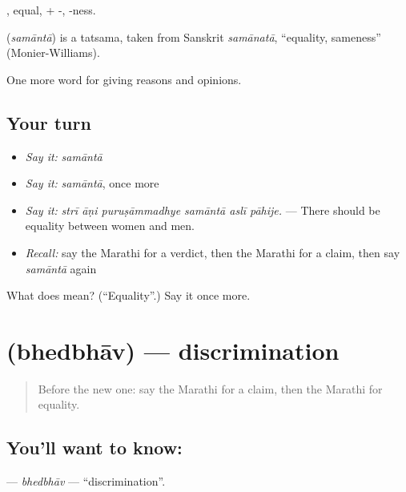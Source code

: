 , equal, + -, -ness.

\begin{cousinweb}
\textbf{} (\emph{samāntā}) is a tatsama, taken from Sanskrit \emph{samānatā}, \textquotedblleft{}equality, sameness\textquotedblright{} (Monier-Williams).
\end{cousinweb}

\begin{grammarlens}[title={What you've built}]
One more word for giving reasons and opinions.
\end{grammarlens}

\subsection*{Your turn}
\begin{itemize}
\raggedright
  \item \emph{Say it:} \emph{samāntā}
  \item \emph{Say it:} \emph{samāntā}, once more
  \item \emph{Say it:} \emph{strī āṇi puruṣāmmadhye samāntā aslī pāhije.} — There should be equality between women and men.
  \item \emph{Recall:} say the Marathi for a verdict, then the Marathi for a claim, then say \emph{samāntā} again
\end{itemize}

\begin{tcolorbox}[breakable,colback=teal!4,colframe=teal!35!black,title={Before you move on}]
What does  mean? (\textquotedblleft{}Equality\textquotedblright{}.) Say it once more.
\end{tcolorbox}
\section[\texorpdfstring{\mr{भेदभाव} (bhedbhāv)}{भेदभाव (bhedbhāv)}]{ (bhedbhāv) — discrimination}

\label{lesson:MR-C360-bhedbhav}



\begin{quote}
Before the new one: say the Marathi for a claim, then the Marathi for equality.
\end{quote}

\subsection*{You'll want to know: }
\textbf{} — \emph{bhedbhāv} — \textquotedblleft{}discrimination\textquotedblright{}.

